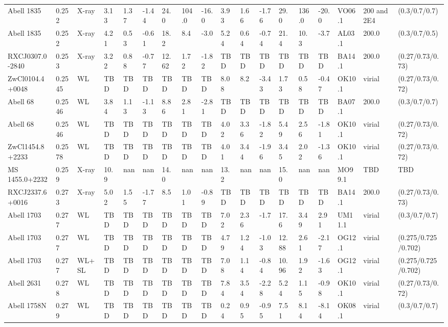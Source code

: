 \documentclass{article}
\begin{document}
\begin{center}
\begin{landscape}
\begin{longtable}{llllllllllllllllll}
Abell 1835 & 0.252 & X-ray & 3.13 & 1.37 & -1.44 & 24.0 & 104.0 & -16.0 & 3.93 & 1.66 & -1.76 & 29.0 & 136.0 & -20.0 & VO06.1 & 200 and 2E4 & (0.3/0.7/0.7) \\
Abell 1835 & 0.252 & X-ray & 4.21 & 0.53 & -0.61 & 18.2 & 8.4 & -3.0 & 5.24 & 0.64 & -0.74 & 21.4 & 10.3 & -3.7 & AL03.1 & 200.0 & (0.3/0.7/0.5) \\
RXCJ0307.0-2840 & 0.253 & X-ray & 3.22 & 0.88 & -0.77 & 12.62 & 1.72 & -1.82 & TBD & TBD & TBD & TBD & TBD & TBD & BA14.1 & 200.0 & (0.27/0.73/0.73) \\
ZwCl0104.4+0048 & 0.2545 & WL & TBD & TBD & TBD & TBD & TBD & TBD & 8.08 & 8.2 & -3.43 & 1.73 & 0.58 & -0.47 & OK10.1 & virial & (0.27/0.73/0.72) \\
Abell 68 & 0.2546 & WL & 3.84 & 1.13 & -1.13 & 8.86 & 2.81 & -2.81 & TBD & TBD & TBD & TBD & TBD & TBD & BA07.1 & 200.0 & (0.3/0.7/0.7) \\
Abell 68 & 0.2546 & WL & TBD & TBD & TBD & TBD & TBD & TBD & 4.02 & 3.36 & -1.82 & 5.49 & 2.56 & -1.81 & OK10.1 & virial & (0.27/0.73/0.72) \\
ZwCl1454.8+2233 & 0.2578 & WL & TBD & TBD & TBD & TBD & TBD & TBD & 4.01 & 3.44 & -1.96 & 3.45 & 2.02 & -1.36 & OK10.1 & virial & (0.27/0.73/0.72) \\
MS 1455.0+2232 & 0.259 & X-ray & 10.9 & nan & nan & 14.0 & nan & nan & 13.2 & nan & nan & 15.0 & nan & nan & MO99.1 & TBD & TBD \\
RXCJ2337.6+0016 & 0.273 & X-ray & 5.02 & 1.55 & -1.77 & 8.5 & 1.01 & -0.89 & TBD & TBD & TBD & TBD & TBD & TBD & BA14.1 & 200.0 & (0.27/0.73/0.73) \\
Abell 1703 & 0.277 & WL & TBD & TBD & TBD & TBD & TBD & TBD & 7.02 & 2.36 & -1.7 & 17.6 & 3.49 & 2.91 & UM11.1 & virial & (0.3/0.7/0.7) \\
Abell 1703 & 0.277 & WL & TBD & TBD & TBD & TBD & TBD & TBD & 4.79 & 1.24 & -1.03 & 12.88 & 2.61 & -2.17 & OG12.1 & virial & (0.275/0.725/0.702) \\
Abell 1703 & 0.277 & WL+SL & TBD & TBD & TBD & TBD & TBD & TBD & 7.08 & 1.14 & -0.84 & 10.96 & 1.92 & -1.63 & OG12.1 & virial & (0.275/0.725/0.702) \\
Abell 2631 & 0.278 & WL & TBD & TBD & TBD & TBD & TBD & TBD & 7.84 & 3.54 & -2.28 & 5.24 & 1.15 & -0.98 & OK10.1 & virial & (0.27/0.73/0.72) \\
Abell 1758N & 0.279 & WL & TBD & TBD & TBD & TBD & TBD & TBD & 0.24 & 0.95 & -0.95 & 7.51 & 8.14 & -8.14 & OK08.1 & virial & (0.3/0.7/0.7) \\

\end{longtable}
\end{landscape}
\end{center}
\end{document}
